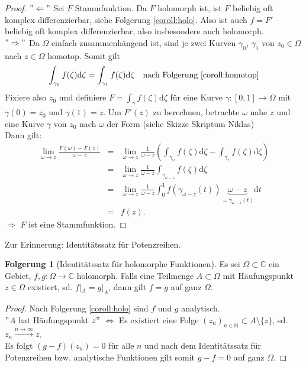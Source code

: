 \documentclass[11pt,titlepage]{article}
\theoremstyle{definition}
\newtheorem{corollary}[theorem]{Folgerung}
\theoremstyle{remark}
\begin{document}
	\begin{proof}
		$"\Leftarrow"$ Sei $F$ Stammfunktion. Da $F$ holomorph ist, ist $F$ beliebig oft komplex 
		differenzierbar, siehe Folgerung \ref{coroll:holo}. Also ist auch $f=F'$ beliebig oft komplex 
		differenzierbar, also insbesondere auch holomorph. \\
		$"\Rightarrow"$ Da $\Omega$ einfach zusammenhängend ist, sind je zwei Kurven 
		$\gamma_0$, $\gamma_1$ von $z_0\in\Omega$ nach $z\in\Omega$ homotop. Somit gilt 
		\[ \int_{\gamma_0} f(\zeta)\mathrm{d}\zeta =\int_{\gamma_1}f(\zeta)\mathrm{d}\zeta 
		\quad \text{nach Folgerung \ref{coroll:homotop}} \]
		Fixiere also $z_0$ und definiere $F=\int_{\gamma} f(\zeta)\mathrm{d}\zeta$ für eine Kurve 
		$\gamma:[0,1]\to\Omega$ mit $\gamma(0)=z_0$ und $\gamma(1)=z$. 
		Um $F'(z)$ zu berechnen, betrachte $\omega$ nahe $z$ und eine Kurve $\gamma$ von $z_0$ 
		nach $\omega$ der Form (siehe Skizze Skriptum Niklas) \\
		Dann gilt:
		\begin{eqnarray*}
			\lim_{\omega\to z}\frac{F(\omega)-F(z)}{\omega -z} &=&
			\lim_{\omega\to z}\frac{1}{\omega -z}\left( \int_{\gamma_{\omega}}f(\zeta)\mathrm{d}\zeta -
			\int_{\gamma_z}f(\zeta)\mathrm{d}\zeta \right) \\
			&=&\lim_{\omega\to z}\frac{1}{\omega -z}\int_{\gamma_{\omega -z}}
			f(\zeta)\mathrm{d}\zeta \\
			&=&\lim_{\omega\to z}\frac{1}{\omega -z}\int_0^1 f(\gamma_{\omega -z}(t))
			\underbrace{\omega -z}_{=\dot{\gamma}_{\omega -z}(t)}\mathrm{d}t \\
			&=& f(z).
		\end{eqnarray*}
		$\Rightarrow$ $F$ ist eine Stammfunktion.
	\end{proof}
	
	Zur Erinnerung: Identitätssatz für Potenzreihen.
	
	\begin{corollary}[Identitätssatz für holomorphe Funktionen]
		Es sei $\Omega\subset\mathbb{C}$ ein Gebiet, $f,g:\Omega\to\mathbb{C}$ holomorph. Falls 
		eine Teilmenge $A\subset\Omega$ mit Häufungspunkt $z\in\Omega$ existiert, sd. 
		$f|_A =g|_A$, dann gilt $f=g$ auf ganz $\Omega$.
	\end{corollary}
	
	\begin{proof} 
		Nach Folgerung \ref{coroll:holo} sind $f$ und $g$ analytisch. \\
		$"$$A$ hat Häufungspunkt $z"$ $\Leftrightarrow$ Es existiert eine Folge 
		$(z_n)_{n\in\mathbb{N}}
		\subset A\setminus\{ z\}$, sd. $z_n\xrightarrow{n\to\infty} z$. \\
		Es folgt $(g-f)(z_n)=0$ für alle $n$ und nach dem Identitätssatz für Potenzreihen bzw. 
		analytische Funktionen gilt somit $g-f=0$ auf ganz $\Omega$.
	\end{proof}
	
\end{document}
